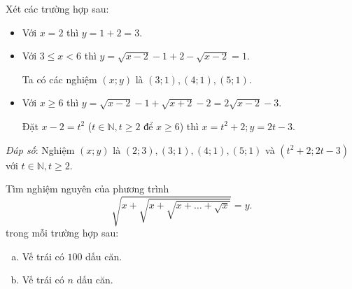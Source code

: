 \begin{bt}
{\begin{enumerate}[a)]
	Xét các trường hợp sau:
	\begin{itemize}
		\item Với $ x=2 $ thì $ y=1+2=3. $
		\item Với $ 3 \leq x< 6 $ thì $ y= \sqrt{x-2}-1+2- \sqrt{x-2}=1. $ 
		
		Ta có các nghiệm $ (x;y) $ là $ (3;1), (4;1), (5;1). $ 
		\item Với $ x \geq6 $ thì $ y= \sqrt{x-2}-1+ \sqrt{x+2}-2=2 \sqrt{x-2}-3. $
		
		Đặt $ x-2=t^2$ ($t\in \mathbb{N}, t \geq 2 \text{ để } x \geq 6$) thì $ x=t^2+2; y=2t-3. $
    \end{itemize}	
		\textit{Đáp số}: Nghiệm $ (x;y) $ là $ (2;3), (3;1), (4;1), (5;1) $ và $ (t^2+2;2t-3) $ với $ t \in \mathbb{N}, t \geq 2. $ 	
\end{enumerate}
}
\end{bt}

\begin{bt}
   Tìm nghiệm nguyên của phương trình $$ \sqrt{x+ \sqrt{x+ \sqrt{x+ \ldots+ \sqrt{x}}}}=y. $$
   trong mỗi trường hợp sau:
   \begin{enumerate}[a)]
   	\item Vế trái có $ 100 $ dấu căn.
   	\item Vế trái có $ n $ dấu căn.
   \end{enumerate}
\end{bt}	

